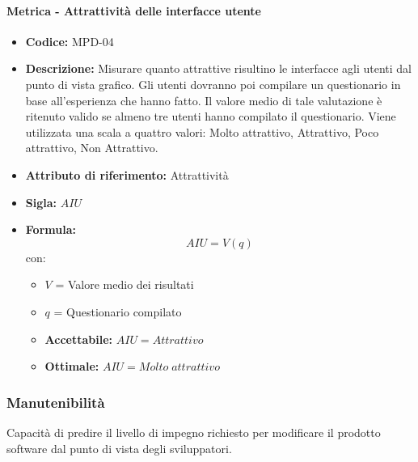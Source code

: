     \paragraph{Metrica - Attrattività delle interfacce utente} 
        \begin{itemize}
          \item  \textbf{Codice: } MPD-04
          \item  \textbf{Descrizione:} Misurare quanto attrattive risultino le interfacce agli utenti dal punto di vista grafico. Gli utenti dovranno poi compilare 
          un questionario in base all'esperienza che hanno fatto. Il valore medio di tale valutazione è ritenuto valido se almeno tre utenti hanno compilato il questionario. 
          Viene utilizzata una scala a quattro valori: Molto attrattivo, Attrattivo, Poco attrattivo, Non Attrattivo.
          \item  \textbf{Attributo di riferimento:} Attrattività
          \item  \textbf{Sigla:} $AIU$
           \item \textbf{Formula:}$$AIU = V (q) $$
           con:
        \begin{itemize}
            \item $V$ = Valore medio dei risultati
            \item $q$ = Questionario compilato
        \end{itemize}

        \begin{itemize}
            \item \textbf{Accettabile:} $AIU = Attrattivo$ 
            \item \textbf{Ottimale:} $AIU = Molto \; attrattivo$
        \end{itemize}
    \end{itemize}


        \subsubsection{Manutenibilità} 
    Capacità di predire il livello di impegno richiesto per modificare il prodotto software dal punto di vista degli sviluppatori.
    
